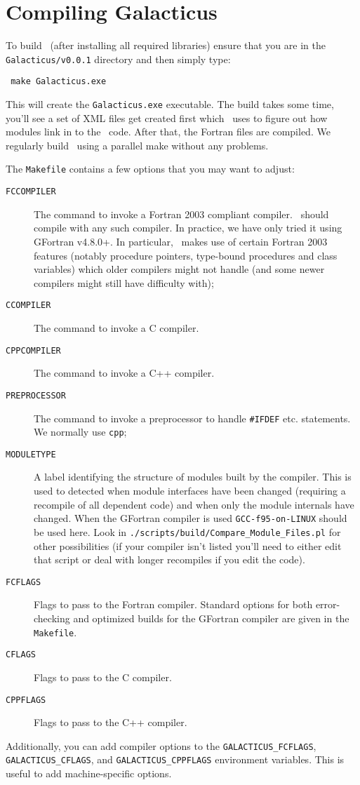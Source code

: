 \section{Compiling Galacticus}

To build \glc\ (after installing all required libraries) ensure that you are in the {\tt Galacticus/v0.0.1} directory and then simply type:
\begin{verbatim}
 make Galacticus.exe
\end{verbatim}
This will create the {\tt Galacticus.exe} executable. The build takes some time, you'll see a set of XML files get created first which \glc\ uses to figure out how modules link in to the \glc\ code. After that, the Fortran files are compiled. We regularly build \glc\ using a parallel make without any problems.

The {\tt Makefile} contains a few options that you may want to adjust:
\begin{description}
 \item[{\tt FCCOMPILER}] The command to invoke a Fortran 2003 compliant compiler. \glc\ should compile with any such compiler. In practice, we have only tried it using {\sc GFortran} v4.8.0+. In particular, \glc\ makes use of certain Fortran 2003 features (notably procedure pointers, type-bound procedures and class variables) which older compilers might not handle (and some newer compilers might still have difficulty with);
 \item[{\tt CCOMPILER}] The command to invoke a C compiler.
 \item[{\tt CPPCOMPILER}] The command to invoke a C++ compiler.
 \item[{\tt PREPROCESSOR}] The command to invoke a preprocessor to handle {\tt \#IFDEF} etc. statements. We normally use {\tt cpp};
 \item[{\tt MODULETYPE}] A label identifying the structure of modules built by the compiler. This is used to detected when module interfaces have been changed (requiring a recompile of all dependent code) and when only the module internals have changed. When the {\sc GFortran} compiler is used {\tt GCC-f95-on-LINUX} should be used here. Look in {\tt ./scripts/build/Compare\_Module\_Files.pl} for other possibilities (if your compiler isn't listed you'll need to either edit that script or deal with longer recompiles if you edit the code).
 \item[{\tt FCFLAGS}] Flags to pass to the Fortran compiler. Standard options for both error-checking and optimized builds for the {\sc GFortran} compiler are given in the {\tt Makefile}.
 \item[{\tt CFLAGS}] Flags to pass to the C compiler.
 \item[{\tt CPPFLAGS}] Flags to pass to the C++ compiler.
\end{description}
Additionally, you can add compiler options to the {\tt GALACTICUS\_FCFLAGS}, {\tt GALACTICUS\_CFLAGS}, and {\tt GALACTICUS\_CPPFLAGS} environment variables. This is useful to add machine-specific options.

